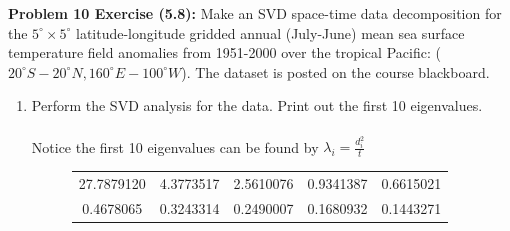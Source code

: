 \documentclass[11pt]{article}
\newenvironment{problem}[1]{\textbf{Problem #1: }}{\newpage}
\newenvironment{Shaded}{\begin{snugshade}}{\end{snugshade}}
\newcommand{\CommentTok}[1]{\textcolor[rgb]{0.56,0.35,0.01}{\textit{#1}}}
\newcommand{\ControlFlowTok}[1]{\textcolor[rgb]{0.13,0.29,0.53}{\textbf{#1}}}
\newcommand{\DecValTok}[1]{\textcolor[rgb]{0.00,0.00,0.81}{#1}}
\newcommand{\KeywordTok}[1]{\textcolor[rgb]{0.13,0.29,0.53}{\textbf{#1}}}
\newcommand{\NormalTok}[1]{#1}
\newcommand{\OperatorTok}[1]{\textcolor[rgb]{0.81,0.36,0.00}{\textbf{#1}}}
\newcommand{\StringTok}[1]{\textcolor[rgb]{0.31,0.60,0.02}{#1}}
\begin{document}
	\begin{problem}{10 Exercise (5.8)}
		Make an SVD space-time data decomposition for the $5^\circ \times 5^\circ$
		latitude-longitude gridded annual (July-June) mean sea surface temperature field anomalies from 1951-2000 over
		the tropical Pacific: ($20^\circ S -20^\circ N, 160^\circ E -100^\circ W$). The dataset is posted on the course
		blackboard. 
		\begin{enumerate}[label = (\alph*)]
			\item Perform the SVD analysis for the data. Print out the first 10 eigenvalues.
			\\ \\
			Notice the first 10 eigenvalues can be found by $\lambda_i = \frac{d_i^2}{t}$
			\begin{figure}[h!]
				\centering
				\begin{tabular}{|c|c|c|c|c|}
					\hline
					27.7879120 & 4.3773517 & 2.5610076 & 0.9341387 & 0.6615021 \\
					 0.4678065 & 0.3243314 & 0.2490007 & 0.1680932 & 0.1443271 \\
					 \hline
				\end{tabular}
			\end{figure}

\begin{Shaded}
\end{Shaded}
\end{enumerate}
\end{problem}
\end{document}
